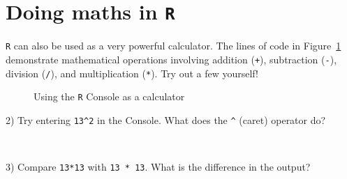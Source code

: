 \documentclass[
  letterpaper,
  DIV=11,
  numbers=noendperiod,
  oneside]{scrreprt}
\begin{document}
\section{\texorpdfstring{Doing maths in
\texttt{R}}{Doing maths in R}}\label{doing-maths-in-r}

\texttt{R} can also be used as a very powerful calculator. The lines of
code in Figure~\ref{fig-ConsoleInputMathematicalOperations} demonstrate
mathematical operations involving addition (\texttt{+}), subtraction
(\texttt{-}), division (\texttt{/}), and multiplication (\texttt{*}).
Try out a few yourself!

\begin{figure}


\caption{\label{fig-ConsoleInputMathematicalOperations}Using the
\texttt{R} Console as a calculator}

\end{figure}%

\begin{tcolorbox}[enhanced jigsaw, breakable, colbacktitle=quarto-callout-tip-color!10!white, bottomtitle=1mm, colframe=quarto-callout-tip-color-frame, leftrule=.75mm, bottomrule=.15mm, colback=white, toptitle=1mm, rightrule=.15mm, title=\textcolor{quarto-callout-tip-color}{\faLightbulb}\hspace{0.5em}{Quiz time!}, coltitle=black, opacityback=0, arc=.35mm, left=2mm, titlerule=0mm, toprule=.15mm, opacitybacktitle=0.6]

2) Try entering \texttt{13\^{}2} in the Console. What does the
\texttt{\^{}} (caret) operator do?

~

3) Compare \texttt{13*13} with \texttt{13\ *\ 13}. What is the
difference in the output?

\end{tcolorbox}
\end{document}
